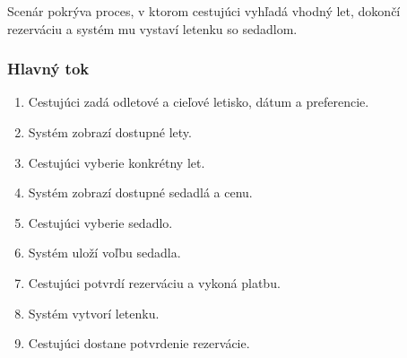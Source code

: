 \documentclass[11pt, a4paper]{article}
\begin{document}
Scenár pokrýva proces, v ktorom cestujúci vyhľadá vhodný let, dokončí rezerváciu
a systém mu vystaví letenku so sedadlom.

\subsubsection*{Hlavný tok}
\begin{enumerate}
    \item Cestujúci zadá odletové a cieľové letisko, dátum a preferencie.
    \item Systém zobrazí dostupné lety.
    \item Cestujúci vyberie konkrétny let.
    \item Systém zobrazí dostupné sedadlá a cenu.
    \item Cestujúci vyberie sedadlo.
    \item Systém uloží voľbu sedadla.
    \item Cestujúci potvrdí rezerváciu a vykoná platbu.
    \item Systém  vytvorí letenku.
    \item Cestujúci dostane potvrdenie rezervácie.
\end{enumerate}
\end{document}

